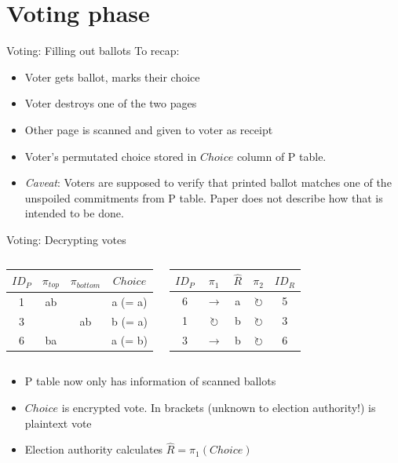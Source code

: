 \documentclass{beamer}
\begin{document}
\section{Voting phase}

\begin{frame}{Voting: Filling out ballots}
	To recap:
	\begin{itemize}
		\item Voter gets ballot, marks their choice
		\item Voter destroys one of the two pages
		\item Other page is scanned and given to voter as receipt
		\item Voter's permutated choice stored in $Choice$ column of P table.
		\item \emph{Caveat}: Voters are supposed to verify that printed
			ballot matches one of the unspoiled commitments from P
			table. Paper does not describe how that is intended to
			be done.
	\end{itemize}
\end{frame}

\begin{frame}{Voting: Decrypting votes}
	\begin{columns}
		\begin{center}
			\begin{tabular}{|c|c|c|c|}
				\hline
				$ID_P$ & $\pi_{top}$ & $\pi_{bottom}$ & $Choice$ \\
				\hline
				1 & ab &    & a (= a) \\
				3 &    & ab & b (= a) \\
				6 & ba &    & a (= b) \\
				\hline
			\end{tabular}
		\end{center}
		\begin{center}
			\begin{tabular}{|c|c|c|c|c|}
				\hline
				$ID_P$ & $\pi_1$ & $\hat{R}$ & $\pi_2$ & $ID_R$ \\
				\hline
				6 & $\rightarrow$       & a & $\circlearrowright$ & 5 \\
				1 & $\circlearrowright$ & b & $\circlearrowright$ & 3 \\
				3 & $\rightarrow$       & b & $\circlearrowright$ & 6 \\
				\hline
			\end{tabular}
		\end{center}
	\end{columns}

	\begin{itemize}
		\item P table now only has information of scanned ballots
		\item $Choice$ is encrypted vote. In brackets (unknown to election
			authority!) is plaintext vote
		\item Election authority calculates $\hat{R} = \pi_1(Choice)$
	\end{itemize}
\end{frame}
\end{document}
